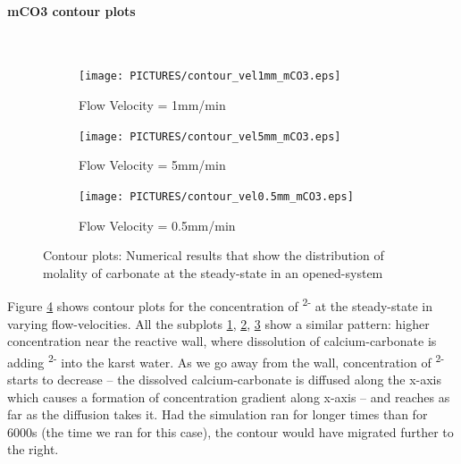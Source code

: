 \paragraph*{mCO3 contour plots} \mbox{}\\

\begin{figure}[!h]
\centering
    \begin{subfigure}{.5\linewidth}
        \centering
        \texttt{[image: PICTURES/contour\_vel1mm\_mCO3.eps]}
        \caption{Flow Velocity = 1mm/min}
        \label{fig:CO3Steady-state}       %
    \end{subfigure}%
    \hfill
    \begin{subfigure}{.5\linewidth}
        \centering
        \texttt{[image: PICTURES/contour\_vel5mm\_mCO3.eps]}
        \caption{Flow Velocity = 5mm/min}
        \label{fig:CO3Steady-state5mm}       %
    \end{subfigure}%
    \hfill
    \begin{subfigure}{.5\linewidth}
        \centering
        \texttt{[image: PICTURES/contour\_vel0.5mm\_mCO3.eps]}
        \caption{Flow Velocity = 0.5mm/min}
        \label{fig:CO3Steady-state0.5mm}       %
    \end{subfigure}%
    \caption{\DuMuX Contour plots: Numerical results that show the distribution of molality of carbonate at the steady-state in an opened-system}
     \label{fig:contourCO3}
\end{figure}


Figure \ref{fig:contourCO3} shows contour plots for the concentration of \textsuperscript{2-} at the steady-state in varying flow-velocities. All the subplots \ref{fig:CO3Steady-state}, \ref{fig:CO3Steady-state5mm}, \ref{fig:CO3Steady-state0.5mm} show a similar pattern: higher concentration near the reactive wall, where dissolution of calcium-carbonate is adding \textsuperscript{2-} into the karst water. As we go away from the wall, concentration of \textsuperscript{2-} starts to decrease -- the dissolved calcium-carbonate is diffused along the x-axis which causes a formation of concentration gradient along x-axis -- and reaches as far as the diffusion takes it. Had the simulation ran for longer times than for 6000s (the time we ran for this case), the contour would have migrated further to the right. 

